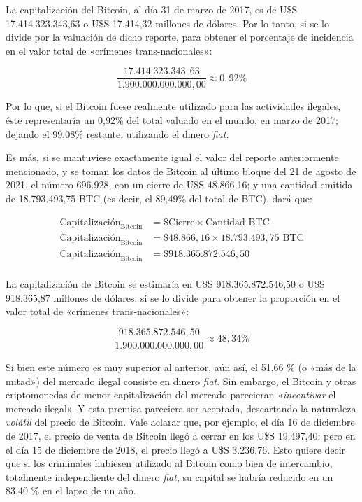 \documentclass[12pt,a4paper,twoside]{book}
\begin{document}
La capitalización del Bitcoin, al día 31 de marzo de 2017, es de U\$S 17.414.323.343,63 o U\$S 17.414,32 millones de dólares. Por lo tanto, si se lo divide por la valuación de dicho reporte, para obtener el porcentaje de incidencia en el valor total de «crímenes trans-nacionales»:

\begin{equation*}
\dfrac{17.414.323.343,63}{1.900.000.000.000,00} \approx 0,92\%
\end{equation*}

Por lo que, si el Bitcoin fuese realmente utilizado para las actividades ilegales, éste representaría un 0,92\% del total valuado en el mundo, en marzo de 2017; dejando el 99,08\% restante, utilizando el dinero \textit{fiat}.

Es más, si se mantuviese exactamente igual el valor del reporte anteriormente mencionado, y se toman los datos de Bitcoin al último bloque del 21 de agosto de 2021, el número 696.928, con un cierre de U\$S 48.866,16; y una cantidad emitida de 18.793.493,75 BTC (es decir, el 89,49\% del total de BTC), dará que:

\begin{align*}
\text{Capitalización}_{\text{Bitcoin}} &= \text{\$ Cierre} \times \text{Cantidad BTC} \\
\text{Capitalización}_{\text{Bitcoin}} &= \text{\$ } 48.866,16 \times 18.793.493,75 \text{ BTC} \\
\text{Capitalización}_{\text{Bitcoin}} &= \text{\$ } 918.365.872.546,50 \\
\end{align*}

La capitalización de Bitcoin se estimaría en U\$S 918.365.872.546,50 o U\$S 918.365,87 millones de dólares. si se lo divide para obtener la proporción en el valor total de «crímenes trans-nacionales»:

\begin{equation*}
\dfrac{918.365.872.546,50}{1.900.000.000.000,00} \approx 48,34\%
\end{equation*}

Si bien este número es muy superior al anterior, aún así, el 51,66 \% (o «más de la mitad») del mercado ilegal consiste en dinero \textit{fiat}. Sin embargo, el Bitcoin y otras criptomonedas de menor capitalización del mercado parecieran «\textit{incentivar} el mercado ilegal». Y esta premisa pareciera ser aceptada, descartando la naturaleza \textit{volátil} del precio de Bitcoin. Vale aclarar que, por ejemplo, el día 16 de diciembre de 2017, el precio de venta de Bitcoin llegó a cerrar en los U\$S 19.497,40; pero en el día 15 de diciembre de 2018, el precio llegó a U\$S 3.236,76. Esto quiere decir que si los criminales hubiesen utilizado al Bitcoin como bien de intercambio, totalmente independiente del dinero \textit{fiat}, su capital se habría reducido en un 83,40 \% en el lapso de un año.
\end{document}

